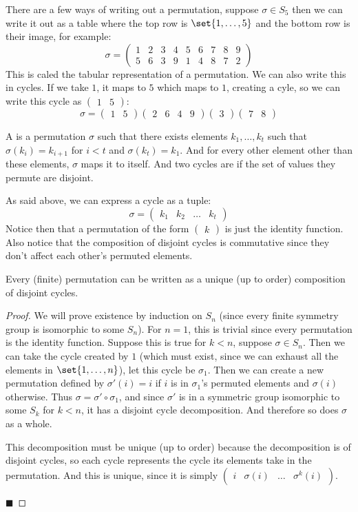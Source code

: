 \documentclass[10pt]{article}
\def\pmat#1{\begin{pmatrix} #1 \end{pmatrix}}
\begin{document}
There are a few ways of writing out a permutation, suppose $\sigma\in S_5$ then we can write it out as a table where the top row is $\set{1,\dots,5}$ and the bottom row is their image, for example:
\[ \sigma = \begin{pmatrix} 1 & 2 & 3 & 4 & 5 & 6 & 7 & 8 & 9 \\ 5 & 6 & 3 & 9 & 1 & 4 & 8 & 7 & 2 \end{pmatrix} \]
This is caled the tabular representation of a permutation.
We can also write this in cycles.
If we take $1$, it maps to $5$ which maps to $1$, creating a cyle, so we can write this cycle as $\pmat{1&5}$:
\[ \sigma = \pmat{1&5}\pmat{2&6&4&9}\pmat{3}\pmat{7&8} \]

\begin{defn*}

    A  is a permutation $\sigma$ such that there exists elements $k_1,\dots,k_t$ such that $\sigma(k_i)=k_{i+1}$ for $i<t$ and $\sigma(k_t)=k_1$.
    And for every other element other than these elements, $\sigma$ maps it to itself.
    And two cycles are  if the set of values they permute are disjoint.

\end{defn*}

As said above, we can express a cycle as a tuple:
\[ \sigma = \pmat{k_1&k_2&\ldots&k_t} \]
Notice then that a permutation of the form $\pmat{k}$ is just the identity function.
Also notice that the composition of disjoint cycles is commutative since they don't affect each other's permuted elements.

\begin{thrm*}

    Every (finite) permutation can be written as a unique (up to order) composition of disjoint cycles.

\end{thrm*}

\begin{proof}

    We will prove existence by induction on $S_n$ (since every finite symmetry group is isomorphic to some $S_n$).
    For $n=1$, this is trivial since every permutation is the identity function.
    Suppose this is true for $k<n$, suppose $\sigma\in S_n$.
    Then we can take the cycle created by $1$ (which must exist, since we can exhaust all the elements in $\set{1,\dots,n}$), let this cycle be $\sigma_1$.
    Then we can create a new permutation defined by $\sigma'(i)=i$ if $i$ is in $\sigma_1$'s permuted elements and $\sigma(i)$ otherwise.
    Thus $\sigma=\sigma'\circ\sigma_1$, and since $\sigma'$ is in a symmetric group isomorphic to some $S_k$ for $k<n$, it has a disjoint cycle decomposition.
    And therefore so does $\sigma$ as a whole.

    This decomposition must be unique (up to order) because the decomposition is of disjoint cycles, so each cycle represents the cycle its elements take in the permutation.
    And this is unique, since it is simply $\pmat{i&\sigma(i)&\ldots&\sigma^k(i)}$.

    \hfill$\blacksquare$

\end{proof}
\end{document}
